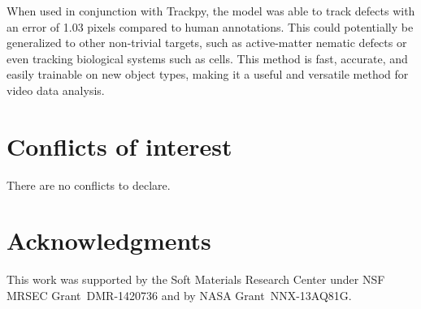 \documentclass[twoside,twocolumn,9pt]{article}
\renewcommand{\refname}{Notes and references}
\begin{document}
When used in conjunction with Trackpy, the model was able to track defects with an error of 1.03 pixels compared to human annotations. This could potentially be generalized to other non-trivial targets, such as active-matter nematic defects\cite{GiomiDefectdynamicsactive2014,DeCampOrientationalordermotile2015} or even tracking biological systems such as cells\cite{MeijeringTrackingcelldevelopmental2009}. This method is fast, accurate, and easily trainable on new object types, making it a useful and versatile method for video data analysis.


\section*{Conflicts of interest}
There are no conflicts to declare.

\section{Acknowledgments}
This work was supported by the Soft Materials Research Center under NSF MRSEC Grant~DMR-1420736 and  by NASA Grant~NNX-13AQ81G.



\balance


\end{document}
